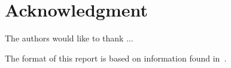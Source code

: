 \documentclass[pdf,ps2pdf,11pt]{SANDreport}
\begin{document}
\section*{Acknowledgment}
The authors would like to thank ...

The format of this report is based on information found
in~\cite{Sand98-0730}.

%
\clearpage
\tableofcontents
\listoffigures




%
\SANDmain %
\end{document}
